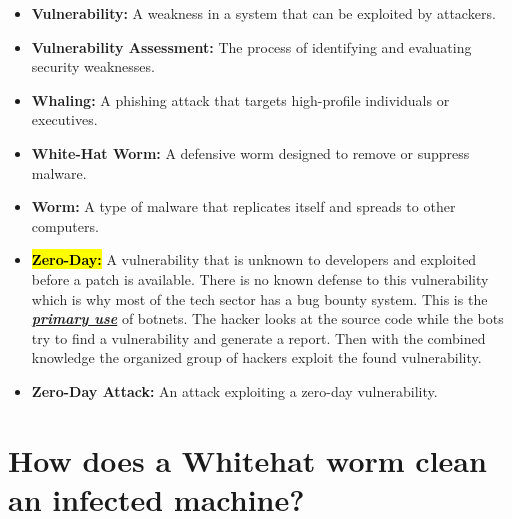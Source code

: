 \documentclass{article}
\begin{document}
\begin{itemize}
    \item \textbf{Vulnerability:} A weakness in a system that can be exploited by attackers.
    \item \textbf{Vulnerability Assessment:} The process of identifying and evaluating security weaknesses.
    \item \textbf{Whaling:} A phishing attack that targets high-profile individuals or executives.
    \item \textbf{White-Hat Worm:} A defensive worm designed to remove or suppress malware.
    \item \textbf{Worm:} A type of malware that replicates itself and spreads to other computers. 
    \item \textbf{\hl{Zero-Day:}} A vulnerability that is unknown to developers and exploited before a patch is available. There is no known defense to this vulnerability which is why most of the tech sector has a bug bounty system. This is the \textbf{\textit{\underline{primary use}}} of botnets. The hacker looks at the source code while the bots try to find a vulnerability and generate a report. Then with the combined knowledge the organized group of hackers exploit the found vulnerability.
    \item \textbf{Zero-Day Attack:} An attack exploiting a zero-day vulnerability.
\end{itemize}

\newpage \section{How does a Whitehat worm clean an infected machine?}
\end{document}
